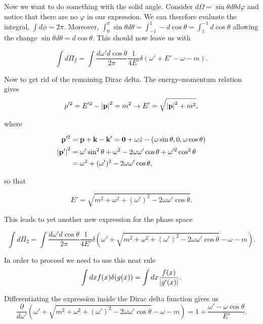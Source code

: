 \documentclass[11pt, a4paper]{amsart}
\begin{document}
Now we want to do something with the solid angle. Consider $ d\Omega = \sin\theta d\theta d\varphi$ and notice that there are no $\varphi$ in our expression. We can therefore evaluate the integral, $\int d\phi = 2\pi$. Moreover, $\int_0^\pi \sin\theta d\theta = \int_{-1}^1 -d\cos\theta = \int_1^{-1} d\cos\theta$ allowing the change $\sin\theta d\theta = d\cos\theta$. This should now leave us with

\begin{equation}
\int d\Pi_2 = \int \frac{d\omega' d\cos\theta}{2\pi} \frac{1}{4E'} \delta (\omega' + E' - \omega -m).
\end{equation}

Now to get rid of the remaining Dirac delta. The energy-momentum relation gives
\begin{equation}
p'^2 = E'^2 - \abs{\vb{p}}^2 = m^2 \rightarrow E' = \sqrt{\abs{\vb{p}}^2 + m^2},
\end{equation}

where 

\begin{align}
\vb{p}'^2 &= \vb{p} + \vb{k} - \vb{k}' = \vb{0} + \omega\hat{z} - (\omega\sin\theta, 0, \omega\cos\theta) \\
\abs{\vb{p}'}^2	&= \omega'\sin^2\theta + \omega^2 - 2\omega\omega'\cos\theta + \omega'^2\cos^2\theta \\
						&= \omega^2 + (\omega')^2 - 2\omega\omega'\cos\theta,
\end{align}

so that

\begin{equation}
E' = \sqrt{m^2 + \omega^2 + (\omega')^2 - 2\omega\omega'\cos\theta}.
\end{equation}

This leads to yet another new expression for the phase space

\begin{equation}
\int d\Pi_2 = \int \frac{d\omega' d\cos\theta}{2\pi} \frac{1}{4E'} \delta (\omega' + \sqrt{m^2 + \omega^2 + (\omega')^2 - 2\omega\omega'\cos\theta} - \omega -m).
\end{equation}

In order to proceed we need to use this neat rule
\begin{equation}
\int dx f(x) \delta(g(x)) = \int dx \frac{f(x)}{\abs{g'(x)}}.
\end{equation}

Differentiating the expression inside the Dirac delta function gives us
\begin{equation}
\frac{\partial}{d\omega'} \left(\omega' + \sqrt{m^2 + \omega^2 + (\omega')^2 - 2\omega\omega'\cos\theta} - \omega -m \right)
= 1 + \frac{\omega' - \omega\cos\theta}{E'}.
\end{equation}
\end{document}
